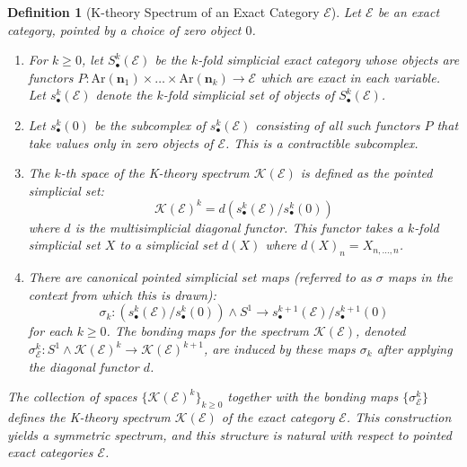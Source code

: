 \documentclass[12pt]{report}
\numberwithin{equation}{section}
\newtheorem{definition}[dummy]{Definition}
\begin{document}
	
	\begin{definition}[K-theory Spectrum of an Exact Category \(\mathcal{E}\)]
		Let $\mathcal{E}$ be an exact category, pointed by a choice of zero object $0$.
		\begin{enumerate}
			\item For $k \ge 0$, let $S_{\bullet}^k(\mathcal{E})$ be the $k$-fold simplicial exact category whose objects are functors $P: \mathrm{Ar}(\mathbf{n}_1) \times \dots \times \mathrm{Ar}(\mathbf{n}_k) \to \mathcal{E}$ which are exact in each variable. Let $s_{\bullet}^k(\mathcal{E})$ denote the $k$-fold simplicial set of objects of $S_{\bullet}^k(\mathcal{E})$.
			
			\item Let $s_{\bullet}^k(0)$ be the subcomplex of $s_{\bullet}^k(\mathcal{E})$ consisting of all such functors $P$ that take values only in zero objects of $\mathcal{E}$. This is a contractible subcomplex.
			
			\item The {$k$-th space of the K-theory spectrum} $\mathcal{K}(\mathcal{E})$ is defined as the pointed simplicial set:
			\[ \mathcal{K}(\mathcal{E})^k = d\left(s_{\bullet}^k(\mathcal{E}) / s_{\bullet}^k(0)\right) \]
			where $d$ is the multisimplicial diagonal functor. This functor takes a $k$-fold simplicial set $X$ to a simplicial set $d(X)$ where $d(X)_n = X_{n,\dots,n}$.
			
			\item There are canonical pointed simplicial set maps (referred to as $\sigma$ maps in the context from which this is drawn):
			\[ \sigma_k : \left(s_{\bullet}^k(\mathcal{E})/s_{\bullet}^k(0)\right) \wedge S^1 \to s_{\bullet}^{k+1}(\mathcal{E})/s_{\bullet}^{k+1}(0) \]
			for each $k \ge 0$. The {bonding maps} for the spectrum $\mathcal{K}(\mathcal{E})$, denoted $\sigma_{\mathcal{E}}^k : S^1 \wedge \mathcal{K}(\mathcal{E})^k \to \mathcal{K}(\mathcal{E})^{k+1}$, are induced by these maps $\sigma_k$ after applying the diagonal functor $d$.
		\end{enumerate}
		The collection of spaces $\{\mathcal{K}(\mathcal{E})^k\}_{k \ge 0}$ together with the bonding maps $\{\sigma_{\mathcal{E}}^k\}$ defines the K-theory spectrum $\mathcal{K}(\mathcal{E})$ of the exact category $\mathcal{E}$. This construction yields a symmetric spectrum, and this structure is natural with respect to pointed exact categories $\mathcal{E}$.
	\end{definition}
	
\end{document}
